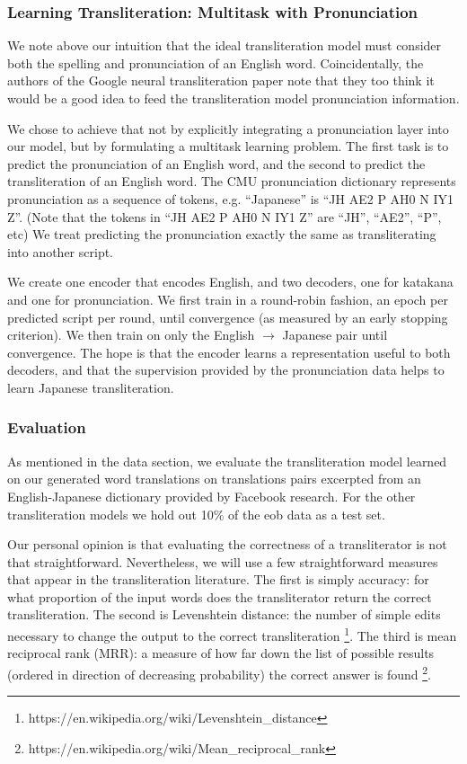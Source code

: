 \documentclass{article}
\begin{document}
\subsubsection*{Learning Transliteration: Multitask with Pronunciation}

We note above our intuition that the ideal transliteration model
must consider both the spelling and pronunciation of an English word.
Coincidentally,
the authors of the Google neural transliteration paper
\cite{Rosca2016SequencetosequenceNN}
note that they too think it would be a good idea
to feed the transliteration model pronunciation information.

We chose to achieve that not by
explicitly integrating a pronunciation layer into our model,
but by formulating a multitask learning problem.
The first task is to predict the pronunciation of an English word,
and the second to predict the transliteration of an English word.
The CMU pronunciation dictionary represents pronunciation
as a sequence of tokens,
e.g. ``Japanese'' is ``JH AE2 P AH0 N IY1 Z''.
(Note that the tokens in ``JH AE2 P AH0 N IY1 Z''
are ``JH'', ``AE2'', ``P'', etc)
We treat predicting the pronunciation exactly the same as
transliterating into another script.

We create one encoder that encodes English,
and two decoders, one for katakana and one for pronunciation.
We first train in a round-robin fashion,
an epoch per predicted script per round,
until convergence (as measured by an early stopping criterion).
We then train on only the English $\rightarrow$ Japanese pair
until convergence.
The hope is that the encoder learns a representation useful to both decoders,
and that the supervision provided by the pronunciation data
helps to learn Japanese transliteration.

\subsubsection*{Evaluation}

As mentioned in the data section,
we evaluate the transliteration model learned on our generated word translations
on translations pairs excerpted from an English-Japanese dictionary
provided by Facebook research.
For the other transliteration models
we hold out 10\% of the eob data as a test set.

Our personal opinion is that evaluating the correctness
of a transliterator is not that straightforward.
Nevertheless,
we will use a few straightforward measures
that appear in the transliteration literature.
The first is simply accuracy:
for what proportion of the input words
does the transliterator return the correct transliteration.
The second is Levenshtein distance:
the number of simple edits necessary to change the output to
the correct transliteration
\footnote{https://en.wikipedia.org/wiki/Levenshtein\_distance}.
The third is mean reciprocal rank (MRR):
a measure of how far down the list of possible results
(ordered in direction of decreasing probability)
the correct answer is found
\footnote{https://en.wikipedia.org/wiki/Mean\_reciprocal\_rank}.
\end{document}
